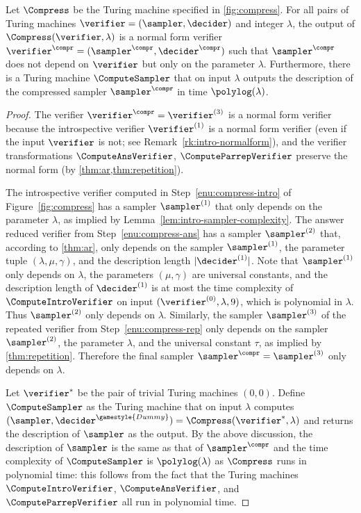 \begin{lemma}
  \label{lem:compress-independent-samplers}
  Let $\Compress$ be the Turing machine specified in \cref{fig:compress}.
  For all pairs of Turing machines $\verifier = (\sampler,\decider)$ and integer $\lambda$, the output of
  $\Compress(\verifier, \lambda)$ is a normal form verifier $\verifier^\compr =
  (\sampler^\compr, \decider^\compr)$ such that $\sampler^\compr$ does not
  depend on $\verifier$ but only on the parameter $\lambda$.
  Furthermore, there is a Turing machine $\ComputeSampler$ that on input
  $\lambda$ outputs the description of the compressed sampler $\sampler^\compr$
  in time $\polylog(\lambda)$.
\end{lemma}

\begin{proof}
  The verifier $\verifier^\compr = \verifier^{(3)}$ is a normal form verifier
  because the introspective verifier $\verifier^{(1)}$ is a normal form verifier (even if
  the input $\verifier$ is not; see Remark~\ref{rk:intro-normalform}), and 
  the verifier transformations $\ComputeAnsVerifier$, $\ComputeParrepVerifier$ preserve 
  the normal form (by \cref{thm:ar,thm:repetition}).  


  The introspective verifier computed in Step~\ref{enu:compress-intro} of
  Figure~\ref{fig:compress} has a sampler $\sampler^{(1)}$ that only depends on
  the parameter $\lambda$, as implied by
  Lemma~\ref{lem:intro-sampler-complexity}.
  The answer reduced verifier from Step~\ref{enu:compress-ans} has a sampler $\sampler^{(2)}$ 
  that, according to \cref{thm:ar}, only depends on the sampler $\sampler^{(1)}$, the parameter tuple $(\lambda,\mu,\gamma)$, 
  and the description length $|\decider^{(1)}|$. Note that $\sampler^{(1)}$ only depends on $\lambda$, the parameters $(\mu,\gamma)$ are universal constants, and the description length
  of $\decider^{(1)}$ is at most the time complexity of $\ComputeIntroVerifier$ on input $(\verifier^{(0)}, \lambda,9)$, which is polynomial in $\lambda$. Thus $\sampler^{(2)}$ only depends on $\lambda$. Similarly, the sampler $\sampler^{(3)}$ of the repeated verifier from Step~\ref{enu:compress-rep} only depends on the sampler $\sampler^{(2)}$, the parameter $\lambda$, and the universal constant $\tau$, as implied by \cref{thm:repetition}. Therefore the final sampler $\sampler^\compr = \sampler^{(3)}$ only depends on $\lambda$.
  
  


  Let $\verifier^*$ be the pair of trivial Turing machines $(0,0)$. Define $\ComputeSampler$ as the Turing machine that on input $\lambda$
  computes $(\sampler, \decider^{\gamestyle{Dummy}}) =
  \Compress(\verifier^*, \lambda)$ and returns the description of $\sampler$ as
  the output. By the above discussion, the description of $\sampler$ is the same
  as that of $\sampler^\compr$ and the time complexity of $\ComputeSampler$ is 
  $\polylog(\lambda)$ as $\Compress$ runs in polynomial time: this follows from
  the fact that the Turing machines $\ComputeIntroVerifier$,
  $\ComputeAnsVerifier$, and $\ComputeParrepVerifier$ all run in polynomial time.
\end{proof}

